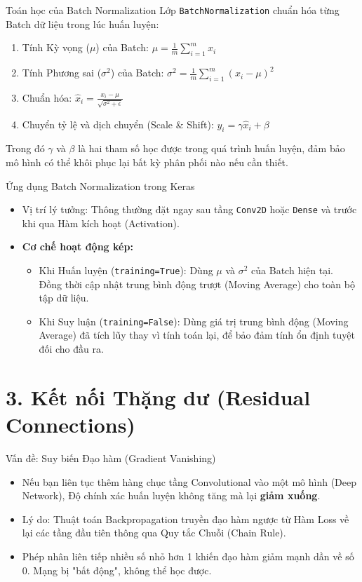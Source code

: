 \documentclass[aspectratio=169]{beamer}
\begin{document}
\begin{frame}{Toán học của Batch Normalization}
    Lớp \texttt{BatchNormalization} chuẩn hóa từng Batch dữ liệu trong lúc huấn luyện:
    \begin{enumerate}
        \item Tính Kỳ vọng ($\mu$) của Batch: $\mu = \frac{1}{m} \sum_{i=1}^m x_i$
        \item Tính Phương sai ($\sigma^2$) của Batch: $\sigma^2 = \frac{1}{m} \sum_{i=1}^m (x_i - \mu)^2$
        \item Chuẩn hóa: $\hat{x}_i = \frac{x_i - \mu}{\sqrt{\sigma^2 + \epsilon}}$
        \item Chuyển tỷ lệ và dịch chuyển (Scale \& Shift): $y_i = \gamma \hat{x}_i + \beta$
    \end{enumerate}
    Trong đó $\gamma$ và $\beta$ là hai tham số học được trong quá trình huấn luyện, đảm bảo mô hình có thể khôi phục lại bất kỳ phân phối nào nếu cần thiết.
\end{frame}

\begin{frame}{Ứng dụng Batch Normalization trong Keras}
    \begin{itemize}
        \item Vị trí lý tưởng: Thông thường đặt ngay sau tầng \texttt{Conv2D} hoặc \texttt{Dense} và trước khi qua Hàm kích hoạt (Activation).
        \item \textbf{Cơ chế hoạt động kép:}
        \begin{itemize}
            \item Khi Huấn luyện (\texttt{training=True}): Dùng $\mu$ và $\sigma^2$ của Batch hiện tại. Đồng thời cập nhật trung bình động trượt (Moving Average) cho toàn bộ tập dữ liệu.
            \item Khi Suy luận (\texttt{training=False}): Dùng giá trị trung bình động (Moving Average) đã tích lũy thay vì tính toán lại, để bảo đảm tính ổn định tuyệt đối cho đầu ra.
        \end{itemize}
    \end{itemize}
\end{frame}

\section{3. Kết nối Thặng dư (Residual Connections)}

\begin{frame}{Vấn đề: Suy biến Đạo hàm (Gradient Vanishing)}
    \begin{itemize}
        \item Nếu bạn liên tục thêm hàng chục tầng Convolutional vào một mô hình (Deep Network), Độ chính xác huấn luyện không tăng mà lại \textbf{giảm xuống}.
        \item Lý do: Thuật toán Backpropagation truyền đạo hàm ngược từ Hàm Loss về lại các tầng đầu tiên thông qua Quy tắc Chuỗi (Chain Rule).
        \item Phép nhân liên tiếp nhiều số nhỏ hơn 1 khiến đạo hàm giảm mạnh dần về số 0. Mạng bị "bất động", không thể học được.
    \end{itemize}
\end{frame}
\end{document}
